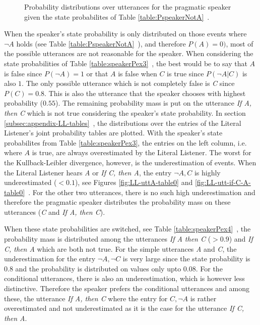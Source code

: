  \begin{figure}[ht]
 \centering
  \qquad
{} 
 \caption{Probability distributions over utterances for the pragmatic speaker given the state probabilites of Table \ref{table:PspeakerNotA}~.}
 \label{fig:speakerExamples34}
 \end{figure}
 
When the speaker's state probability is only distributed on those events where $\neg A$ holds (see Table \ref{table:PspeakerNotA}~), and therefore $P(A)=0)$, most of the possible utterances are not reasonable for the speaker. When considering the state probabilities of Table \ref{table:speakerPex3}~, the best would be to say that $A$ is false since $P(\neg A)=1$ or that $A$ is false when $C$ is true since $P(\neg A|C)$ is also $1$. The only possible utterance which is not completely false is \textit{C} since $P(C)=0.8$. This is also the utterance that the speaker chooses with highest probability ($0.55$). The remaining probability mass is put on the utterance \textit{If A, then C} which is not true considering the speaker's state probability. In section \ref{subsec:appendix-LL-tables}~, the distributions over the entries of the Literal Listener's joint probability tables are plotted. With the speaker's state probabilites from Table \ref{table:speakerPex3}, the entries on the left column, i.e. where $A$ is true, are always overestimated by the Literal Listener. The worst for the Kullback-Leibler divergence, however, is the underestimation of events. When the Literal Listener hears \textit{A} or \textit{If C, then A}, the entry $\neg A, C$ is highly underestimated ($<0.1$), see Figures \ref{fig:LL-uttA-table0} and \ref{fig:LL-utt-if-C-A-table0}~. For the other two utterances, there is no such high underestimation and therefore the pragmatic speaker distributes the probability mass on these utterances (\textit{C} and \textit{If A, then C}). 

When these state probabilities are switched, see Table \ref{table:speakerPex4}~, the probability mass is distributed among the utterances \textit{If A then C} ($>0.9$) and \textit{If C, then A} which are both not true. For the simple utterances \textit{A} and \textit{C}, the underestimation for the entry $\neg A, \neg C$ is very large since the state probability is $0.8$ and the probability is distributed on values only upto $0.08$. For the conditional utterances, there is also an underestimation, which is however less distinctive. Therefore the speaker prefers the conditional utterances and among these, the utterance \textit{If A, then C} where the entry for $C, \neg A$ is rather overestimated and not underestimated as it is the case for the utterance \textit{If C, then A}.

